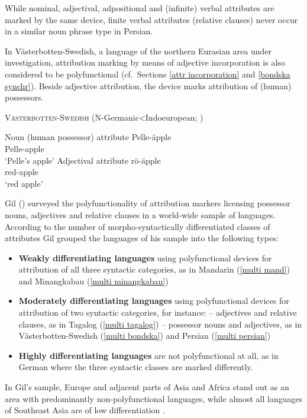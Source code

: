 While nominal, adjectival, adpositional and (infinite) verbal attributes are mark\-ed by the same device, finite verbal attributes (relative clauses) never occur in a similar noun phrase type in Persian.

In Västerbotten-Swedish, a language of the northern Eurasian area under investigation, attribution marking by means of adjective incorporation is also considered to be polyfunctional (cf.~Sections \ref{attr incorporation} and \ref{bondska synchr}). Beside adjective attribution, the device marks attribution of (human) possessors.%
\begin{exe}
\ex \textsc{Västerbotten-Swedish} (N-Germanic<Indoeuropean; \citealt[5]{gil2005}) \label{multi bondska}
\begin{xlist}
\ex Noun (human possessor) attribute
\gll	Pelle-äpple\\
	Pelle-apple\\
\glt	‘Pelle's apple’
\ex Adjectival attribute
\gll	rö-äpple\\
	red-apple\\
\glt	‘red apple’
\end{xlist}
\end{exe}
Gil (\citeyear{gil2005}) surveyed the polyfunctionality of attribution markers licensing possessor nouns, adjectives and relative clauses in a world-wide sample of languages. According to the number of morpho-syntactically differentiated classes of attributes Gil grouped the languages of his sample into the following types:
\begin{itemize}
\item \textbf{Weakly differentiating languages} using polyfunctional devices for attribution of all three syntactic categories, as in Mandarin (\ref{multi mand}) and Minangkabau (\ref{multi minangkabau})
\item \textbf{Moderately differentiating languages} using polyfunctional devices for attribution of two syntactic categories, for instance:
	\subitem – adjectives and relative clauses, as in Tagalog (\ref{multi tagalog})
	\subitem – possessor nouns and adjectives, as in Västerbotten-Swedish (\ref{multi bondska}) and Persian (\ref{multi persian})
\item \textbf{Highly differentiating languages} are not polyfunctional at all, as in German where the three syntactic classes are marked differently.
\end{itemize}
In Gil's sample, Europe and adjacent parts of Asia and Africa stand out as an area with predominantly non-polyfunctional languages, while almost all languages of Southeast Asia are of low differentiation \citep[8]{gil2005}.

